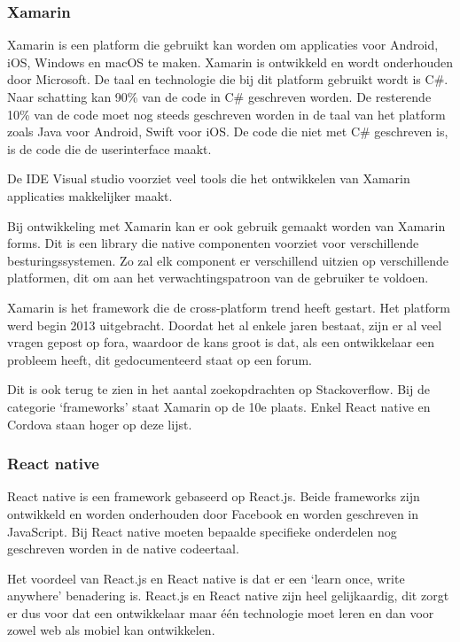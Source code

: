 		
	\subsubsection{Xamarin}
		Xamarin is een platform die gebruikt kan worden om applicaties voor Android, iOS, Windows en macOS te maken.  Xamarin is ontwikkeld en wordt onderhouden door Microsoft. De taal en technologie die bij dit platform gebruikt wordt is C\#. Naar schatting kan 90\% van de code in C\# geschreven worden. De resterende 10\% van de code moet nog steeds geschreven worden in de taal van het platform zoals Java voor Android, Swift voor iOS. De code die niet met C\# geschreven is, is de code die de userinterface maakt.
		\autocite{Altexsoft2019} \autocite{Warcholinski2020}
		
		De IDE Visual studio voorziet veel tools die het ontwikkelen van Xamarin applicaties makkelijker maakt.
		\autocite{VisualStudio2020}
		
		
		Bij ontwikkeling met Xamarin kan er ook gebruik gemaakt worden van Xamarin forms. Dit is een library die native componenten voorziet voor verschillende besturingssystemen. Zo zal elk component er verschillend uitzien op verschillende platformen, dit om aan het verwachtingspatroon van de gebruiker te voldoen.
		\autocite{Microsoft2019}
	
		Xamarin is het framework die de cross-platform trend heeft gestart. Het platform werd begin 2013 uitgebracht. Doordat het al enkele jaren bestaat, zijn er al veel vragen gepost op fora, waardoor de kans groot is dat, als een ontwikkelaar een probleem heeft, dit gedocumenteerd staat op een forum.
		
		Dit is ook terug te zien in het aantal zoekopdrachten op Stackoverflow. Bij de categorie ‘frameworks’ staat Xamarin op de 10e plaats. Enkel React native en Cordova staan hoger op deze lijst.
		\autocite{StackOverflow2020}
		
	\subsubsection{React native}
		React native \autocite{Reactnative2020} is een framework gebaseerd op React.js. Beide frameworks zijn ontwikkeld en worden onderhouden door Facebook en worden geschreven in JavaScript. Bij React native moeten bepaalde specifieke onderdelen nog geschreven worden in de native codeertaal. 
		
		Het voordeel van React.js en React native is dat er een ‘learn once, write anywhere’ benadering is. React.js en React native zijn heel gelijkaardig, dit zorgt er dus voor dat een ontwikkelaar maar één technologie moet leren en dan voor zowel web als mobiel kan ontwikkelen.
		
